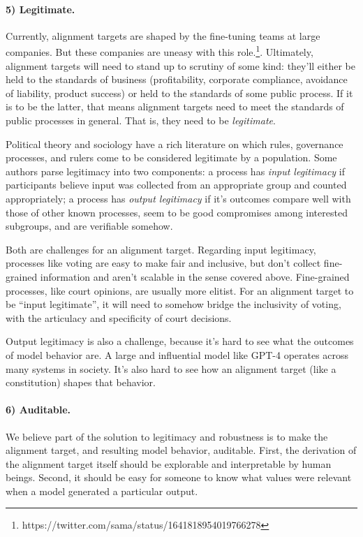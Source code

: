 \documentclass{article}
\theoremstyle{definition}
\begin{document}
\paragraph{5) Legitimate.} Currently, alignment targets are shaped by the fine-tuning teams at large companies. But these companies are uneasy with this role.\footnote{https://twitter.com/sama/status/1641818954019766278}. Ultimately, alignment targets will need to stand up to scrutiny of some kind: they'll either be held to the standards of business (profitability, corporate compliance, avoidance of liability, product success) or held to the standards of some public process. If it is to be the latter, that means alignment targets need to meet the standards of public processes in general. That is, they need to be \textit{legitimate}.

Political theory and sociology have a rich literature \citep{Habermas1996, Weber1947} on which rules, governance processes, and rulers come to be considered legitimate by a population. Some authors parse legitimacy into two components: a process has \emph{input legitimacy} if participants believe input was collected from an appropriate group and counted appropriately; a process has \emph{output legitimacy} if it's outcomes compare well with those of other known processes, seem to be good compromises among interested subgroups, and are verifiable somehow.\citep{Schoon2022,Scharpf1998,Schmidt2020}

Both are challenges for an alignment target. Regarding input legitimacy, processes like voting are easy to make fair and inclusive, but don't collect fine-grained information and aren't scalable in the sense covered above. Fine-grained processes, like court opinions, are usually more elitist. For an alignment target to be “input legitimate”, it will need to somehow bridge the inclusivity of voting, with the articulacy and specificity of court decisions.

Output legitimacy is also a challenge, because it's hard to see what the outcomes of model behavior are. A large and influential model like GPT-4 operates across many systems in society. It's also hard to see how an alignment target (like a constitution) shapes that behavior.

\paragraph{6) Auditable.} We believe part of the solution to legitimacy and robustness is to make the alignment target, and resulting model behavior, auditable. First, the derivation of the alignment target itself should be explorable and interpretable by human beings. Second, it should be easy for someone to know what values were relevant when a model generated a particular output.
\end{document}
